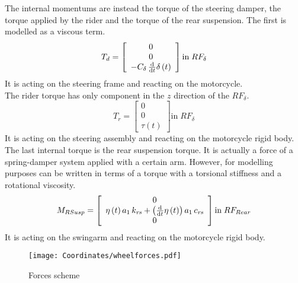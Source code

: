 %
The internal momentums are instead the torque of the steering damper, the torque applied by the rider and the torque of the rear suspension. 
The first is modelled as a viscous term.
%
\begin{equation}
    T_{d} = 
    \left[
    \begin{array}{c}
        0\\
        0\\
        -C_{\delta}\,{\frac {\rm d}{{\rm d}t}}\delta \left( t \right) 
    \end{array}
    \right ]
    \text{in} \; RF_{\delta}
\end{equation}
%
It is acting on the steering frame and reacting on the motorcycle.\\
The rider torque has only component in the $z$ direction of the $RF_\delta$.
%
\begin{equation}
    T_{r} = 
    \left[
    \begin{array}{c}
        0\\
        0\\
        \tau(t)
    \end{array}
    \right ]
    \text{in} \; RF_{\delta}
\end{equation}
%
It is acting on the steering assembly and reacting on the motorcycle rigid body.
The last internal torque is the rear suspension torque. It is actually a force of a spring-damper system applied with a certain arm. However, for modelling purposes can be written in terms of a torque with a torsional stiffness and a rotational viscosity.
%
\begin{equation}
    M_{RSusp} = 
    \left[
    \begin{array}{c}
        0\\
        \eta \left( t \right) a_{1}\,k_{{\it rs}}+ \left( {\frac {\rm d}{
            {\rm d}t}}\eta \left( t \right)  \right) a_{1}\,c_{{\it rs}} \\
        0
    \end{array}
    \right ]
    \text{in} \; RF_{Rear}
\end{equation}
%
It is acting on the swingarm and reacting on the motorcycle rigid body.
%
\begin{figure}[htb]
    \centering
    \texttt{[image: Coordinates/wheelforces.pdf]}
    \caption{Forces scheme}
    \label{fig:WheelForces}
\end{figure}